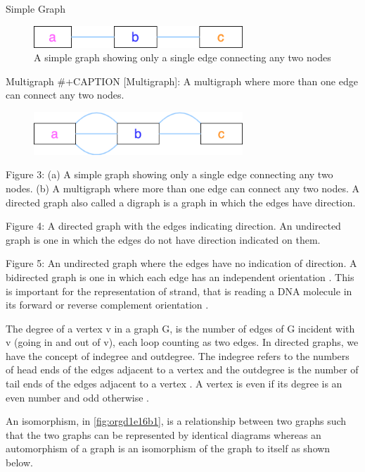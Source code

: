 \documentclass[10pt, a4paper]{article}
\begin{document}
Simple Graph
\begin{figure}
\centering
\includegraphics[width=0.7\textwidth]{figures/Graph-classifications-Simple-Graph.png}
\caption[Simple Graph]{\label{fig:org4e7087d}
A simple graph showing only a single edge connecting any two nodes}
\end{figure}


Multigraph
\#+CAPTION [Multigraph]: A multigraph where more than one edge can connect any two nodes.
\begin{figure}
\centering
\includegraphics[width=0.7\textwidth]{figures/Graph-classifications-Multigraph.png}
\label{org61c4b03}
\end{figure}


Figure 3: (a) A simple graph showing only a single edge connecting any two
nodes. (b) A multigraph where more than one edge can connect any two nodes.
A directed graph also called a digraph is a graph in which the edges have
direction.

Figure 4: A directed graph with the edges indicating direction.
An undirected graph is one in which the edges do not have direction indicated on
them.

Figure 5: An undirected graph where the edges have no indication of direction.
A bidirected graph is one in which each edge has an independent orientation
\cite{edmondsMatchingWellSolvedClass2003}.
This is important for the representation of strand, that is reading a DNA
molecule in its forward or reverse complement orientation 
\cite{patenGenomeGraphsEvolution2017}.

The degree of a vertex v in a graph G, is the number of edges of G incident with
v (going in and out of v), each loop counting as two edges. In directed graphs,
we have the concept of indegree and outdegree. The indegree refers to the
numbers of head ends of the edges adjacent to a vertex and the outdegree is the
number of tail ends of the edges adjacent to a vertex \cite{bondyGraphTheory2011}.
A vertex is even if its degree is an even number and odd otherwise
\cite{trudeauIntroductionGraphTheory1993}.

An isomorphism, in \ref{fig:orgd1e16b1}, is a relationship between two graphs such that the two graphs
can be represented by identical diagrams \cite{bondyGraphTheory2011} whereas an 
automorphism of a graph is an isomorphism of the graph to itself as shown below.
\end{document}
